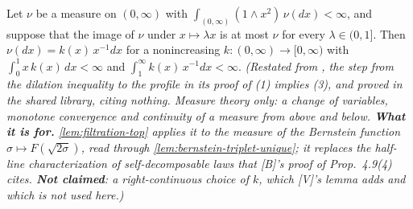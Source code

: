 \begin{lemma}
\label{lem:dilation-decreasing-profile}
\leanok
{}
Let $\nu$ be a measure on $(0,\infty)$ with $\int_{(0,\infty)}(1 \wedge x^2)\,\nu(dx) < \infty$,
and suppose that the image of $\nu$ under $x \mapsto \lambda x$ is at most $\nu$ for every
$\lambda \in (0,1]$. Then $\nu(dx) = k(x)\,x^{-1}dx$ for a nonincreasing
$k : (0,\infty) \to [0,\infty)$ with $\int_0^1 x\,k(x)\,dx < \infty$ and
$\int_1^\infty k(x)\,x^{-1}dx < \infty$.
\statusT\quad\emph{(Restated from , the step from the dilation inequality to the
profile in its proof of (1) implies (3), and proved in the shared library, citing nothing. Measure
theory only: a change of variables, monotone convergence and continuity of a measure from above and
below. \textbf{What it is for.} \ref{lem:filtration-top} applies it to the \Levy{} measure of the
Bernstein function $\sigma \mapsto F(\sqrt{2\sigma})$, read through
\ref{lem:bernstein-triplet-unique}; it replaces the half-line characterization of self-decomposable
laws that [B]'s proof of Prop.~4.9(4) cites. \textbf{Not claimed}: a right-continuous choice of $k$,
which [V]'s lemma adds and which is not used here.)}
\end{lemma}

